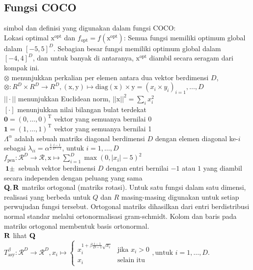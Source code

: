 \subsection{Fungsi COCO}
simbol dan definisi yang digunakan dalam fungsi COCO:\\
Lokasi optimal $\mathrm{x}^{\text{opt}}$ dan $f_{\text{opt}} = f(\mathrm{x}^{\text{opt}})$: Semua fungsi memiliki optimum global dalam $[-5, 5]^D$. Sebagian besar fungsi memiliki optimum global dalam $[-4, 4]^D$, dan untuk banyak di antaranya, $\mathrm{x}^{\text{opt}}$ diambil secara seragam dari kompak ini.\\
\noindent$\otimes$ menunjukkan perkalian per elemen antara dua vektor berdimensi $D$, $\otimes:R^D\times R^D\to R^D, (\mathrm{x},\mathrm{y})\mapsto \text{diag}(\mathrm{x})\times\mathrm{y}=(x_i\times y_i)_{i=1},\ldots,D$\\
$||\cdot||$ menunjukkan Euclidean norm, $||\mathrm{x}||^2=\sum_{i}x^2_i$\\
$\left[\cdot\right]$ menunjukkan nilai bilangan bulat terdekat\\
$\textbf{0}=(0,\ldots,0)^{\mathrm{T}}$ vektor yang semuanya bernilai 0\\
$\textbf{1}=(1,\ldots,1)^{\mathrm{T}}$ vektor yang semuanya bernilai 1\\
$\Lambda^{\alpha}$ adalah sebuah matriks diagonal berdimensi $D$ dengan elemen diagonal ke-$i$ sebagai $\lambda_{ii}=\alpha^{\frac{1}{2}\frac{i-1}{D-1}}$, untuk $i=1,\ldots,D$\\
$f_{\text{pen}}:\mathcal{R}^D\to \mathcal{R}, \mathrm{x}\mapsto\sum_{i=1}^{D}\max(0,\left|x_i\right|-5)^2$\\
$\textbf{1}\pm$ sebuah vektor berdimensi $D$ dengan entri bernilai $-1$ atau $1$ yang diambil secara independen dengan peluang yang sama\\
$\bf{Q, R}$ matriks ortogonal (matriks rotasi). Untuk satu fungsi dalam satu dimensi, realisasi yang berbeda untuk $Q$ dan $R$ masing-masing digunakan untuk setiap perwujudan fungsi tersebut. Ortogonal matriks dihasilkan dari entri berdistribusi normal standar melalui ortonormalisasi gram-schmidt. Kolom dan baris pada matriks ortogonal membentuk basis ortonormal.\\
$\bf{R}$ lihat $\bf{Q}$\\
$T_{\text{asy}}^{\beta}:\mathcal{R}^D\to \mathcal{R}^D,x_i\mapsto \begin{cases}
  x_i^{1+\beta\frac{i-1}{D-1}\sqrt{x_i}} & \text{jika } x_i > 0\\
  x_i & \text{selain itu}
\end{cases}, \text{untuk } i=1,\ldots,D$.\\
